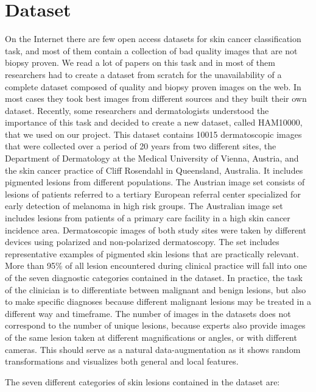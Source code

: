 \section{Dataset} \label{dataset}

	On the Internet there are few open access datasets for skin cancer classification task, and most of them contain a collection of bad quality images that are not biopsy proven. We read a lot of papers on this task and in most of them researchers had to create a dataset from scratch for the unavailability of a complete dataset composed of quality and biopsy proven images on the web. In most cases they took best images from different sources and they built their own dataset. Recently, some researchers and dermatologists understood the importance of this task and decided to create a new dataset, called HAM10000\cite{article4}, that we used on our project. 
	This dataset contains 10015 dermatoscopic images that were collected over a period of 20 years from two different sites, the Department of Dermatology at the Medical University of Vienna, Austria, and the skin cancer practice of Cliff Rosendahl in Queensland, Australia. It includes pigmented lesions from different populations. The Austrian image set consists of lesions of patients referred to a tertiary European referral center specialized for early detection of melanoma in high risk groups. The Australian image set includes lesions from patients of a primary care facility in a high skin cancer incidence area. Dermatoscopic images of both study sites were taken by different devices using polarized and non-polarized dermatoscopy. The set includes representative examples of pigmented skin lesions that are practically relevant. More than 95\% of all lesion encountered during clinical practice will fall into one of the seven diagnostic categories contained in the dataset. In practice, the task of the clinician is to differentiate between malignant and benign lesions, but also to make specific diagnoses because different malignant lesions may be treated in a different way and timeframe. The number of images in the datasets does not correspond to the number of unique lesions, because experts also provide images of the same lesion taken at different magnifications or angles, or with different cameras. This should serve as a natural data-augmentation as it shows random transformations and visualizes both general and local features.
	
	\bigskip
	
	The seven different categories of skin lesions contained in the dataset are:
	
